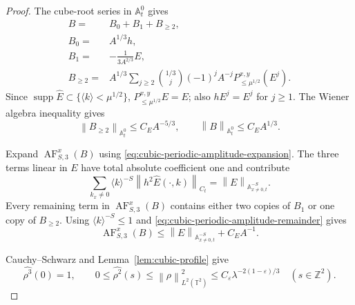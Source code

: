 \documentclass[12pt,reqno,letterpaper]{amsart}
\numberwithin{equation}{section}
\theoremstyle{definition}
\newcommand{\T}{\mathbb T}
\newcommand{\Z}{\mathbb Z}
\newcommand{\A}{\mathbb A}
\newcommand{\eps}{\varepsilon}
\newcommand{\la}{\lambda}
\newcommand{\supp}{\operatorname{supp}}
\newcommand{\norm}[1]{\left\lVert #1\right\rVert}
\begin{document}
\begin{proof}
The cube-root series in $\A^0_t$ gives
\begin{equation}\label{eq:cubic-periodic-amplitude-expansion}
 \begin{split}
 B={}&B_0+B_1+B_{\geq2},\\
 B_0={}&A^{1/3}h,\\
 B_1={}&-\frac{1}{3A^{2/3}}E,\\
 B_{\geq2}={}&A^{1/3}\sum_{j\geq2}
  \binom{1/3}{j}(-1)^jA^{-j}
  P_{\leq\mu^{1/2}}^{x,y}(E^j).
 \end{split}
\end{equation}
Since $\supp\widehat E\subset\{\langle k\rangle<\mu^{1/2}\}$,
$P_{\leq\mu^{1/2}}^{x,y}E=E$; also $hE^j=E^j$ for $j\geq1$.
The Wiener algebra inequality gives
\begin{equation}\label{eq:cubic-periodic-amplitude-remainder}
 \norm{B_{\geq2}}_{\A^0_t}
 \leq C_EA^{-5/3},
 \qquad
 \norm B_{\A^0_t}\leq C_EA^{1/3}.
\end{equation}

Expand $\operatorname{AF}_{S,3}^x(B)$ using
\eqref{eq:cubic-periodic-amplitude-expansion}.  The three terms linear in
$E$ have total absolute coefficient one and contribute
\[
 \sum_{k_x\neq0}\langle k\rangle^{-S}
  \norm{h^2\widehat E(\cdot,k)}_{C_t}
=\norm E_{\A^{-S}_{x\neq0,t}}.
\]
Every remaining term in $\operatorname{AF}_{S,3}^x(B)$ contains
either two copies of $B_1$ or one copy of $B_{\geq2}$.  Using
$\langle k\rangle^{-S}\leq1$ and
\eqref{eq:cubic-periodic-amplitude-remainder} gives
\begin{equation}\label{eq:cubic-periodic-amplitude-AF}
 \operatorname{AF}_{S,3}^x(B)
 \leq\norm E_{\A^{-S}_{x\neq0,t}}+C_EA^{-1}.
\end{equation}

Cauchy--Schwarz and Lemma~\ref{lem:cubic-profile} give
\begin{equation*}
 \widehat{\rho^3}(0)=1,
 \qquad
 0\leq\widehat{\rho^2}(s)\leq\norm{\rho}_{L^2(\T^2)}^2
 \leq C_\eps\la^{-2(1-\eps)/3}
 \quad(s\in\Z^2).
\end{equation*}


\end{proof}
\end{document}
